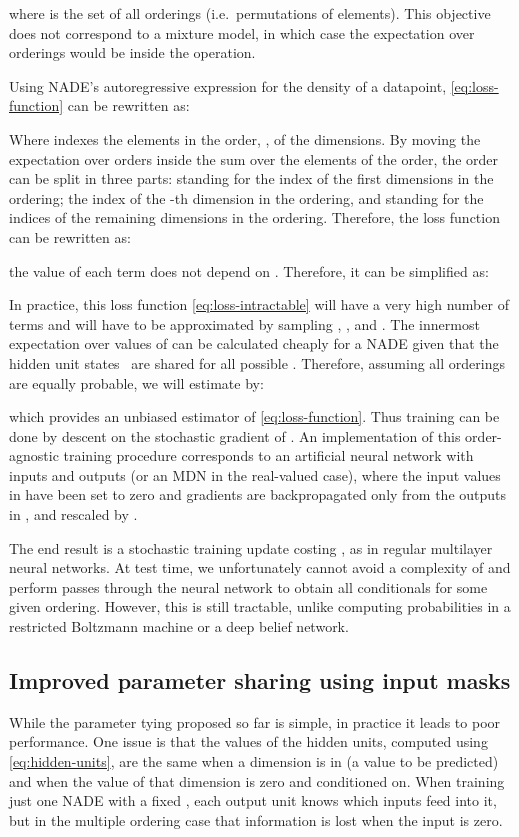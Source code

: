 \documentclass{article}
\newcommand{\ie}{i.e.\ }
\begin{document}
where  is the set of all orderings
(\ie permutations of  elements).
This objective does not correspond to a mixture model, in which case the
expectation over orderings would be inside the  operation.

Using NADE's autoregressive expression for the density of a datapoint,
\eqref{eq:loss-function} can be rewritten as:

Where  indexes the elements in the order, , of the dimensions. By moving
the expectation over orders inside the sum over the elements of the order,
the order can be split in three parts:
 standing for the index of the  first dimensions in the ordering;  the
index of the -th dimension in the ordering, and  standing for the
indices of the remaining dimensions in the ordering. Therefore, the loss function
can be rewritten as:

the value of each term does not depend on . Therefore, it can be
simplified as:

In practice, this loss function \eqref{eq:loss-intractable} will have a very
high number of terms and will have to be approximated by sampling , , and .
The innermost expectation over values of  can be calculated cheaply
for a NADE given that the hidden unit states~ are shared for all
possible .
Therefore, assuming all orderings are equally probable, we will estimate  by:

 which provides an unbiased estimator of \eqref{eq:loss-function}.
Thus training can be done by descent on the stochastic gradient of
.
An implementation of this order-agnostic training procedure corresponds to an
artificial neural network with  inputs and  outputs (or an MDN in the
real-valued case), where the input values in  have been set to zero
and gradients are backpropagated only from the outputs in , and
rescaled by .

The end result is a stochastic training update costing , as in regular multilayer neural networks.  At test time, we
unfortunately cannot avoid a complexity of  and perform 
passes through the neural network to obtain all  conditionals for
some given ordering. However, this is still tractable, unlike
computing probabilities in a restricted Boltzmann machine or
a deep belief network.

\subsection{Improved parameter sharing using input masks}

While the parameter tying proposed so far is simple, in practice it leads to
poor performance. One issue is that the values of the hidden units, computed
using \eqref{eq:hidden-units}, are the same when a dimension is in  (a
value to be predicted) and when the value of that dimension is zero
and conditioned on. When
training just one NADE with a fixed , each output unit knows which inputs
feed into it, but in the multiple ordering case that information is lost when
the input is zero.
\end{document}
